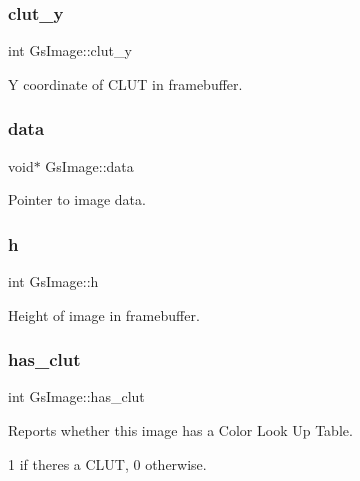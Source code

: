 \subsubsection{\texorpdfstring{clut\+\_\+y}{clut\_y}}
{\footnotesize\ttfamily int Gs\+Image\+::clut\+\_\+y}



Y coordinate of C\+L\+UT in framebuffer. 

\mbox{\label{structGsImage_a911f9bc144bfeb7a1f7a4a761f8107c0}} 
\subsubsection{\texorpdfstring{data}{data}}
{\footnotesize\ttfamily void$\ast$ Gs\+Image\+::data}



Pointer to image data. 

\mbox{\label{structGsImage_a833613285c334d6e02dab93a6851ea9e}} 
\subsubsection{\texorpdfstring{h}{h}}
{\footnotesize\ttfamily int Gs\+Image\+::h}



Height of image in framebuffer. 

\mbox{\label{structGsImage_a08d650746c51afda8d4e3bca004bba33}} 
\subsubsection{\texorpdfstring{has\+\_\+clut}{has\_clut}}
{\footnotesize\ttfamily int Gs\+Image\+::has\+\_\+clut}



Reports whether this image has a Color Look Up Table. 

1 if there\textquotesingle{}s a C\+L\+UT, 0 otherwise. \mbox{\label{structGsImage_a2a97f495c717e8dad31ea67e87945f5e}} 
